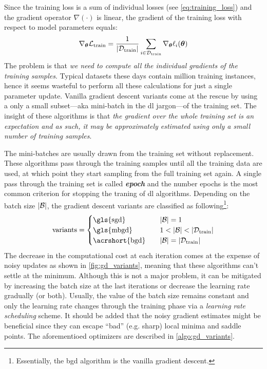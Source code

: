 Since the training loss is a sum of individual losses (see
\Equation{} \ref{eq:training_loss}) and the gradient operator $\nabla(\cdot)$ is linear, the gradient of the training loss with
respect to model parameters equals:
\begin{equation}
	\label{eq:training_loss_grad}
	\nabla_{\boldsymbol{\theta}}\mathcal{L}_\text{train} = \frac{1}{\lvert\mathcal{D}_\text{train}\rvert}
	\sum_{i \in \mathcal{D}_\text{train}} \nabla_{\boldsymbol{\theta}}\ell_i(\boldsymbol{\theta})
\end{equation}
The problem is that \emph{we need to compute all the individual gradients of the
training samples}. Typical datasets these days contain million training
instances, hence it seems wasteful to perform all these calculations for just a
single parameter update. Vanilla gradient descent variants come at the rescue by
using a only a small subset---aka mini-batch in the \gls{dl} jargon---of the
training set. The insight of these algorithms is that \emph{the gradient over
the whole training set is an expectation and as such, it may be approximately
estimated using only a small number of training samples}.

The mini-batches are usually drawn from the training set without replacement.
These algorithms pass through the training samples until all the training data
are used, at which point they start sampling from the full training
set again. A single pass through the training set is called
\emph{\textbf{epoch}} and the number epochs is the most common criterion for
stopping the traning of \gls{dl} algorithms. Depending on the batch size
$\lvert\mathcal{B}\rvert$, the gradient descent variants are classified as
following\footnote{Essentially, the \gls{bgd} algorithm is the vanilla gradient
descent.}:
\begin{equation}
	\begin{aligned}
	\text{variants} =
		\begin{cases}
			\text{\gls{sgd}} \quad &
			\lvert \mcl{B} \rvert = 1 \\
			\text{\gls{mbgd}} \quad &
			1 < \lvert \mcl{B} \rvert < \lvert \dtrain \rvert \\
			\text{\acrshort{bgd}} \quad & 
			\lvert \mcl{B} \rvert = \lvert \dtrain \rvert \\
		\end{cases}
	\end{aligned}
\end{equation}
The decrease in the computational cost at each iteration comes at the expense of
noisy updates as shown in \Figure{} \ref{fig:gd_variants}, meaning that these
algorithms can't settle at the minimum. Although this is not a major problem, it
can be mitigated by increasing the batch size at the last
iterations or decrease the learning rate gradually (or
both). Usually, the value of the batch size remains constant and only the
learning rate changes through the training phase via a \emph{learning rate
scheduling} scheme. It should be added that the noisy gradient estimates might
be beneficial since they can escape ``bad'' (e.g. sharp) local minima and saddle
points. The aforementioed optimizers are described in \Algorithm{}
\ref{algo:gd_variants}.


